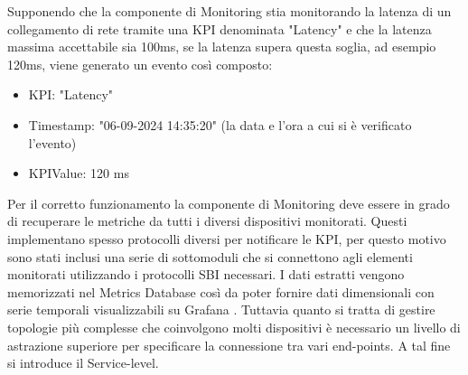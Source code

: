 Supponendo che la componente di Monitoring stia monitorando la latenza di un collegamento di rete tramite una KPI denominata "Latency" e che la latenza massima accettabile sia 100ms,
se la latenza supera questa soglia, ad esempio 120ms, viene generato un evento così composto: 
\begin{itemize}
    \item KPI: "Latency"
    \item Timestamp: "06-09-2024 14:35:20" (la data e l'ora a cui si è verificato l'evento)
    \item KPIValue: 120 ms
\end{itemize}
Per il corretto funzionamento la componente di Monitoring deve essere in grado di recuperare le metriche da tutti i diversi dispositivi monitorati.
Questi implementano spesso protocolli diversi per notificare le KPI, per questo motivo sono stati inclusi una serie di sottomoduli che si connettono 
agli elementi monitorati utilizzando i protocolli SBI necessari. I dati estratti vengono memorizzati nel Metrics Database così da poter fornire dati dimensionali 
con serie temporali visualizzabili su Grafana \cite{grafana}.
Tuttavia quanto si tratta di gestire topologie più complesse che coinvolgono molti dispositivi è necessario un livello di astrazione superiore per specificare la connessione tra vari end-points. A tal fine si introduce il Service-level. 

